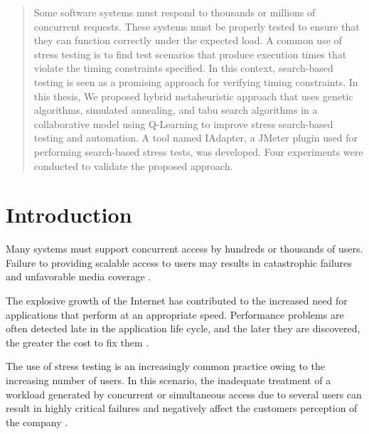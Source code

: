 \date{Received: date / Accepted: date}


\maketitle

\begin{abstract}
Some software systems must respond to thousands or millions of concurrent requests. These systems must be properly tested to ensure that they can function correctly under the expected load. A common use of stress testing is to find test scenarios that produce execution times that violate the timing constraints specified. In this context, search-based testing is seen as a promising approach for verifying timing constraints. In this thesis, We proposed  hybrid metaheuristic approach that uses genetic algorithms, simulated annealing, and tabu search algorithms in a collaborative model using Q-Learning to improve stress search-based  testing and  automation. A tool named IAdapter, a JMeter plugin used for performing search-based stress tests, was developed. Four experiments were conducted to validate the proposed approach.
\end{abstract}

\section{Introduction}

Many systems must support concurrent access by hundreds or thousands of users. Failure to providing scalable access to users may results in catastrophic failures and unfavorable media coverage \cite{Jiang2010}. 

The explosive growth of the Internet has contributed to the increased need for applications that perform at an appropriate speed. Performance problems are often detected late in the application life cycle, and the later they are discovered, the greater the cost to fix them \cite{Molyneaux2009}.

The use of stress testing is an increasingly common practice owing to the increasing number of users. In this scenario, the inadequate treatment of a workload generated by concurrent or simultaneous access due to several users can result in highly critical failures and negatively affect the customers perception of the company \cite{Draheim2006b} \cite{Jiang2010}. 

